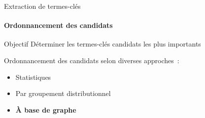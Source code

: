   \begin{frame}{Extraction de termes-clés}\framesubtitle{Ordonnancement des candidats}
    \begin{block}{Objectif}
      Déterminer les termes-clés candidats les plus importants
    \end{block}

    \vspace{1em}

    Ordonnancement des candidats selon diverses approches~:
    \begin{itemize}
      \item{Statistiques~\cite[TF-IDF]{salton1975tfidf}}
      \item{Par groupement distributionnel~\cite{matsuo2004wordcooccurrence}}
      \item{\textbf{À base de graphe}~\cite[TextRank]{mihalcea2004textrank}}
    \end{itemize}
  \end{frame}

